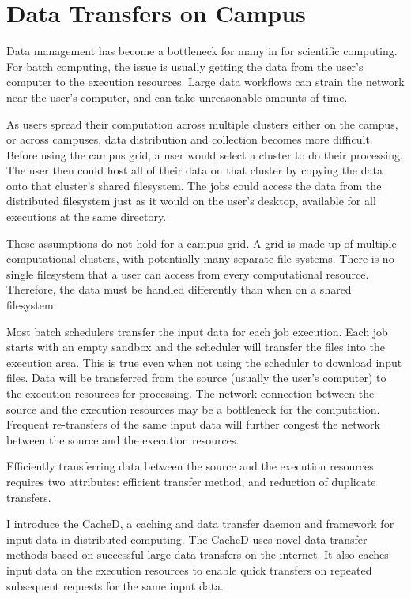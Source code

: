 




\section{Data Transfers on Campus}

Data management has become a bottleneck for many in for scientific computing.  For batch computing, the issue is usually getting the data from the user's computer to the execution resources.  Large data workflows can strain the network near the user's computer, and can take unreasonable amounts of time.

As users spread their computation across multiple clusters either on the campus, or across campuses, data distribution and collection becomes more difficult.  Before using the campus grid, a user would select a cluster to do their processing.  The user then could host all of their data on that cluster by copying the data onto that cluster's shared filesystem.  The jobs could access the data from the distributed filesystem just as it would on the user's desktop, available for all executions at the same directory.

These assumptions do not hold for a campus grid.  A grid is made up of multiple computational clusters, with potentially many separate file systems.  There is no single filesystem that a user can access from every computational resource.  Therefore, the data must be handled differently than when on a shared filesystem.  


Most batch schedulers transfer the input data for each job execution.  Each job starts with an empty sandbox and the scheduler will transfer the files into the execution area.  This is true even when not using the scheduler to download input files.  Data will be transferred from the source (usually the user's computer) to the execution resources for processing.  The network connection between the source and the execution resources may be a bottleneck for the computation.  Frequent re-transfers of the same input data will further congest the network between the source and the execution resources.

Efficiently transferring data between the source and the execution resources requires two attributes: efficient transfer method, and reduction of duplicate transfers.  

I introduce the CacheD, a caching and data transfer daemon and framework for input data in distributed computing.  The CacheD uses novel data transfer methods based on successful large data transfers on the internet.  It also caches input data on the execution resources to enable quick transfers on repeated subsequent requests for the same input data.

